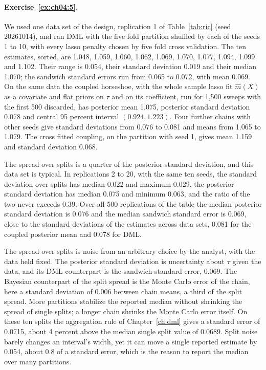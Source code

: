 \paragraph{Exercise~\ref{ex:ch04:5}.} We used one data set of the design, replication 1 of Table~\ref{tab:ric} (seed 20261014), and ran DML with the five fold partition shuffled by each of the seeds 1 to 10, with every lasso penalty chosen by five fold cross validation. The ten estimates, sorted, are 1.048, 1.059, 1.060, 1.062, 1.069, 1.070, 1.077, 1.094, 1.099 and 1.102. Their range is 0.054, their standard deviation 0.019 and their median 1.070; the sandwich standard errors run from 0.065 to 0.072, with mean 0.069. On the same data the coupled horseshoe, with the whole sample lasso fit $\hat m(X)$ as a covariate and flat priors on $\tau$ and on its coefficient, run for 1,500 sweeps with the first 500 discarded, has posterior mean 1.075, posterior standard deviation 0.078 and central 95 percent interval $(0.924, 1.223)$. Four further chains with other seeds give standard deviations from 0.076 to 0.081 and means from 1.065 to 1.079. The cross fitted coupling, on the partition with seed 1, gives mean 1.159 and standard deviation 0.068.

The spread over splits is a quarter of the posterior standard deviation, and this data set is typical. In replications 2 to 20, with the same ten seeds, the standard deviation over splits has median 0.022 and maximum 0.029, the posterior standard deviation has median 0.075 and minimum 0.063, and the ratio of the two never exceeds 0.39. Over all 500 replications of the table the median posterior standard deviation is 0.076 and the median sandwich standard error is 0.069, close to the standard deviations of the estimates across data sets, 0.081 for the coupled posterior mean and 0.078 for DML.

The spread over splits is noise from an arbitrary choice by the analyst, with the data held fixed. The posterior standard deviation is uncertainty about $\tau$ given the data, and its DML counterpart is the sandwich standard error, 0.069. The Bayesian counterpart of the split spread is the Monte Carlo error of the chain, here a standard deviation of 0.006 between chain means, a third of the split spread. More partitions stabilize the reported median without shrinking the spread of single splits; a longer chain shrinks the Monte Carlo error itself. On these ten splits the aggregation rule of Chapter~\ref{ch:dml} gives a standard error of 0.0715, about 4 percent above the median single split value of 0.0689. Split noise barely changes an interval's width, yet it can move a single reported estimate by 0.054, about 0.8 of a standard error, which is the reason to report the median over many partitions.

